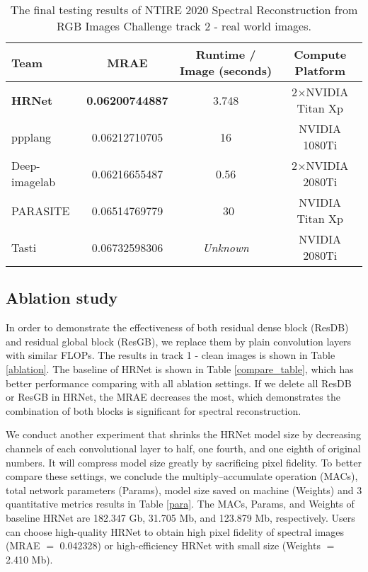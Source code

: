 \documentclass[10pt,twocolumn,letterpaper]{article}
\begin{document}
\begin{table*}[t]
\begin{center}
\begin{tabular}{lccc}
\hline
Team & MRAE & Runtime / Image (seconds) & Compute Platform \\
\hline
\hline
\textbf{HRNet} & \textbf{0.06200744887} & 3.748 & 2$\times$NVIDIA Titan Xp \\
\hline
ppplang & 0.06212710705 & 16 & NVIDIA 1080Ti \\
\hline
Deep-imagelab & 0.06216655487 & 0.56 & 2$\times$NVIDIA 2080Ti \\
\hline
PARASITE & 0.06514769779 & ~30 & NVIDIA Titan Xp \\
\hline
Tasti & 0.06732598306 & \emph{Unknown} & NVIDIA 2080Ti \\
\hline
\end{tabular}
\end{center}
\caption{The final testing results of NTIRE 2020 Spectral Reconstruction from RGB Images Challenge track 2 - real world images.}
\label{track2}
\end{table*}

\subsection{Ablation study}

In order to demonstrate the effectiveness of both residual dense block (ResDB) and residual global block (ResGB), we replace them by plain convolution layers with similar FLOPs. The results in track 1 - clean images is shown in Table \ref{ablation}. The baseline of HRNet is shown in Table \ref{compare_table}, which has better performance comparing with all ablation settings. If we delete all ResDB or ResGB in HRNet, the MRAE decreases the most, which demonstrates the combination of both blocks is significant for spectral reconstruction.

We conduct another experiment that shrinks the HRNet model size by decreasing channels of each convolutional layer to half, one fourth, and one eighth of original numbers. It will compress model size greatly by sacrificing pixel fidelity. To better compare these settings, we conclude the multiply–accumulate operation (MACs), total network parameters (Params), model size saved on machine (Weights) and 3 quantitative metrics results in Table \ref{para}. The MACs, Params, and Weights of baseline HRNet are 182.347 Gb, 31.705 Mb, and 123.879 Mb, respectively. Users can choose high-quality HRNet to obtain high pixel fidelity of  spectral images (MRAE $=$ 0.042328) or high-efficiency HRNet with small size (Weights $=$ 2.410 Mb).
\end{document}
